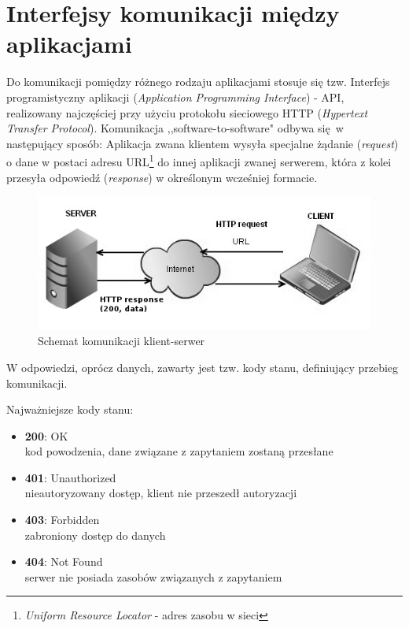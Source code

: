 \section{Interfejsy komunikacji między aplikacjami}
Do komunikacji pomiędzy różnego rodzaju aplikacjami stosuje się tzw. Interfejs programistyczny aplikacji (\emph{Application Programming Interface}) - API, realizowany najczęściej przy użyciu protokołu sieciowego HTTP (\emph{Hypertext Transfer Protocol}).
Komunikacja ,,software-to-software" odbywa się w następujący sposób:
Aplikacja zwana klientem wysyła specjalne żądanie (\emph{request}) o dane w postaci adresu URL\footnote{\emph{Uniform Resource Locator} - adres zasobu w sieci} do innej aplikacji zwanej serwerem, która z kolei przesyła odpowiedź (\emph{response}) w określonym wcześniej formacie.

\begin{figure}[h]
  \centering
  \includegraphics[scale=0.87]{images/http_communication.png}
  \caption{Schemat komunikacji klient-serwer}
\end{figure}

W odpowiedzi, oprócz danych, zawarty jest tzw. kody stanu, definiujący przebieg komunikacji.

Najważniejsze kody stanu:
 \begin{itemize}
     \item \textbf {200}: OK \\
     kod powodzenia, dane związane z zapytaniem zostaną przesłane
     \item \textbf {401}: Unauthorized \\
     nieautoryzowany dostęp, klient nie przeszedł autoryzacji
     \item \textbf {403}: Forbidden \\
     zabroniony dostęp do danych
     \item \textbf {404}: Not Found \\
     serwer nie posiada zasobów związanych z zapytaniem
  \end{itemize}

